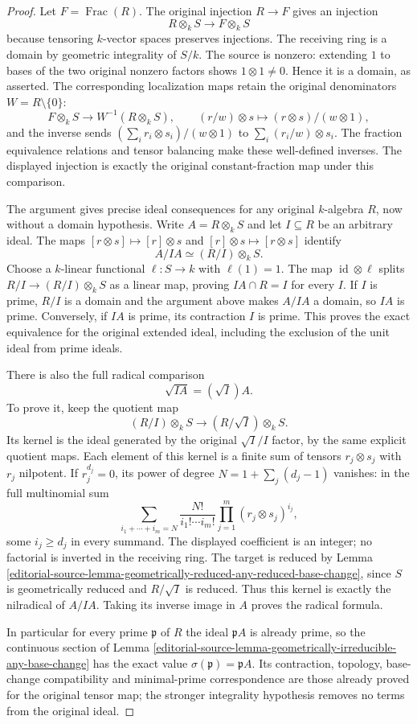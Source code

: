 \begin{proof}
Let $F=\operatorname{Frac}(R)$.
The original injection $R\to F$
gives an injection
$$
R\otimes_k S\longrightarrow F\otimes_k S
$$
because tensoring $k$-vector spaces
preserves injections. The receiving
ring is a domain by geometric
integrality of $S/k$. The source
is nonzero: extending $1$ to
bases of the two original
nonzero factors shows
$1\otimes1\neq0$. Hence it
is a domain, as asserted.
The corresponding localization
maps retain the original
denominators $W=R\setminus\{0\}$:
$$
F\otimes_k S\longrightarrow W^{-1}(R\otimes_k S),
\qquad(r/w)\otimes s\longmapsto(r\otimes s)/(w\otimes1),
$$
and the inverse sends
$(\sum_i r_i\otimes s_i)/(w\otimes1)$
to $\sum_i(r_i/w)\otimes s_i$.
The fraction equivalence relations
and tensor balancing make these
well-defined inverses. The
displayed injection is exactly
the original constant-fraction
map under this comparison.

The argument gives precise
ideal consequences for any
original $k$-algebra $R$, now
without a domain hypothesis.
Write $A=R\otimes_k S$ and
let $I\subseteq R$ be an
arbitrary ideal. The maps
$[r\otimes s]\mapsto[r]\otimes s$
and $[r]\otimes s\mapsto[r\otimes s]$
identify
$$
A/IA\simeq(R/I)\otimes_k S.
$$
Choose a $k$-linear functional
$\ell:S\to k$ with $\ell(1)=1$.
The map $\operatorname{id}\otimes\ell$
splits $R/I\to(R/I)\otimes_k S$
as a linear map, proving
$IA\cap R=I$ for every $I$.
If $I$ is prime, $R/I$ is
a domain and the argument
above makes $A/IA$ a domain,
so $IA$ is prime. Conversely,
if $IA$ is prime, its
contraction $I$ is prime.
This proves the exact equivalence
for the original extended ideal,
including the exclusion of
the unit ideal from prime ideals.

There is also the full radical
comparison
$$
\sqrt{IA}=(\sqrt I)A.
$$
To prove it, keep the quotient
map
$$
(R/I)\otimes_k S\longrightarrow(R/\sqrt I)\otimes_k S.
$$
Its kernel is the ideal
generated by the original
$\sqrt I/I$ factor, by the
same explicit quotient maps.
Each element of this kernel
is a finite sum of tensors
$r_j\otimes s_j$ with $r_j$
nilpotent. If $r_j^{d_j}=0$,
its power of degree
$N=1+\sum_j(d_j-1)$ vanishes:
in the full multinomial sum
$$
\sum_{i_1+\cdots+i_m=N}
\frac{N!}{i_1!\cdots i_m!}
\prod_{j=1}^m(r_j\otimes s_j)^{i_j},
$$
some $i_j\geq d_j$ in every
summand. The displayed coefficient
is an integer; no factorial
is inverted in the receiving ring.
The target is reduced by Lemma
\ref{editorial-source-lemma-geometrically-reduced-any-reduced-base-change},
since $S$ is geometrically reduced
and $R/\sqrt I$ is reduced.
Thus this kernel is exactly
the nilradical of $A/IA$.
Taking its inverse image in
$A$ proves the radical formula.

In particular for every prime
$\mathfrak p$ of $R$ the ideal
$\mathfrak pA$ is already prime,
so the continuous section of
Lemma
\ref{editorial-source-lemma-geometrically-irreducible-any-base-change}
has the exact value
$\sigma(\mathfrak p)=\mathfrak pA$.
Its contraction, topology,
base-change compatibility and
minimal-prime correspondence
are those already proved for
the original tensor map;
the stronger integrality
hypothesis removes no terms
from the original ideal.
\end{proof}


